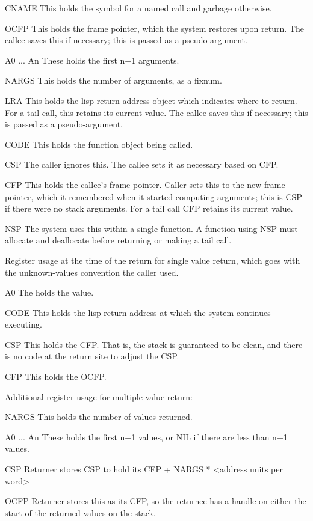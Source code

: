 CNAME
   This holds the symbol for a named call and garbage otherwise.

OCFP
   This holds the frame pointer, which the system restores upon return.  The
   callee saves this if necessary; this is passed as a pseudo-argument.

A0 ... An
   These holds the first n+1 arguments.

NARGS
   This holds the number of arguments, as a fixnum.

LRA
   This holds the lisp-return-address object which indicates where to return.
   For a tail call, this retains its current value.  The callee saves this
   if necessary; this is passed as a pseudo-argument.

CODE
   This holds the function object being called.

CSP
   The caller ignores this.  The callee sets it as necessary based on CFP.

CFP
   This holds the callee's frame pointer.  Caller sets this to the new frame
   pointer, which it remembered when it started computing arguments; this is
   CSP if there were no stack arguments.  For a tail call CFP retains its
   current value.

NSP
   The system uses this within a single function.  A function using NSP must
   allocate and deallocate before returning or making a tail call.

Register usage at the time of the return for single value return, which
goes with the unknown-values convention the caller used.

A0
   The holds the value.

CODE
   This holds the lisp-return-address at which the system continues executing.

CSP
   This holds the CFP.  That is, the stack is guaranteed to be clean, and there
   is no code at the return site to adjust the CSP.

CFP
   This holds the OCFP.

Additional register usage for multiple value return:

NARGS
   This holds the number of values returned.

A0 ... An
   These holds the first n+1 values, or NIL if there are less than n+1 values.

CSP
   Returner stores CSP to hold its CFP + NARGS * <address units per word>

OCFP
   Returner stores this as its CFP, so the returnee has a handle on either
   the start of the returned values on the stack.


